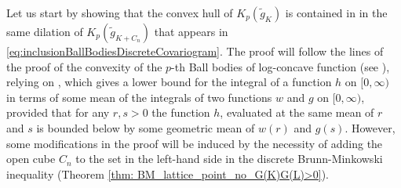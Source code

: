 \documentclass[10pt]{amsart}
\numberwithin{equation}{section}
\begin{document}
Let us start by showing that the convex hull of $K_p(\tilde{g}_K)$ is contained in in the same dilation of $K_p(\tilde{g}_{K+C_n})$ that appears in \eqref{eq:inclusionBallBodiesDiscreteCovariogram}. The proof will follow the lines of the proof of the convexity of the $p$-th Ball bodies of log-concave function (see \cite[Theorem 2.5.5]{BGVV}), relying on \cite[Theorem 2.5.4]{BGVV}, which gives a lower bound for the integral of a function $h$ on $[0,\infty)$ in terms of some mean of the integrals of two functions $w$ and $g$ on $[0,\infty)$, provided that for any $r,s>0$ the function $h$, evaluated at the same mean of $r$ and $s$ is bounded below by some geometric mean of $w(r)$ and $g(s)$. However, some modifications in the proof will be induced by the necessity of adding the open cube $C_n$ to the set in the left-hand side in the discrete Brunn-Minkowski inequality (Theorem \ref{thm: BM_lattice_point_no_G(K)G(L)>0}).
\end{document}
